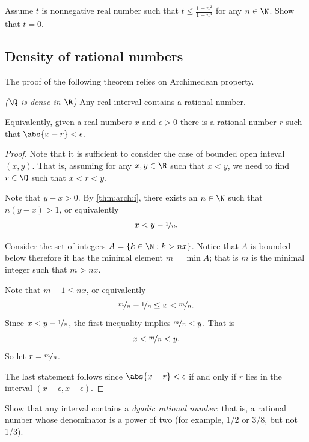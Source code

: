 \documentclass[12pt]{book}
\begin{document}
\begin{exercise}
Assume $t$ is nonnegative real number such that $t\le \tfrac{1+n^2}{1+n^4}$ for any $n\in \N$.
Show that $t=0$.
\end{exercise}

\subsection*{Density of rational numbers}

The proof of the following theorem relies on Archimedean property.

\begin{thm}\label{thm:arch:ii} \emph{($\Q$ is dense in $\R$)} Any real interval contains a rational number.

Equivalently, given a real numbers $x$ and $\epsilon>0$ there is a rational number $r$ such that $\abs{x-r}<\epsilon$.
\end{thm}

\begin{proof} 
Note that it is sufficient to consider the case of bounded open inteval $(x,y)$.
That is, assuming for any $x, y \in \R$ such that
$x < y$, we need to find $r \in \Q$ such that
$x < r < y$.

Note that $y-x > 0$.
By \ref{thm:arch:i}, there exists an $n \in \N$ such that $n(y-x) > 1$,
or equivalently
\begin{equation*}
x<y-\nicefrac1n.
\end{equation*}

Consider the set of integers $A=\{k\in\N : k>nx \}$.
Notice that $A$ is bounded below therefore it has the minimal element $m=\min A$;
that is $m$ is the minimal integer such that $m>nx$.

Note that $m-1\le nx$,
or equivalently 
$$\nicefrac{m}{n}-\nicefrac1{n}\le x<\nicefrac{m}{n}.$$
Since $x<y-\nicefrac1n$, the first inequality implies 
$\nicefrac{m}{n}<y$.
That is 
$$x<\nicefrac{m}{n}<y.$$
So let $r = \nicefrac{m}{n}$.

The last statement follows since $\abs{x-r}<\epsilon$ if and only if $r$ lies in the interval $(x-\epsilon,x+\epsilon)$.
\end{proof}

\begin{exercise}
Show that any interval contains a \emph{dyadic rational number};
that is, a rational number whose denominator is a power of two
(for example, 1/2 or 3/8, but not 1/3).
\end{exercise}
\end{document}
